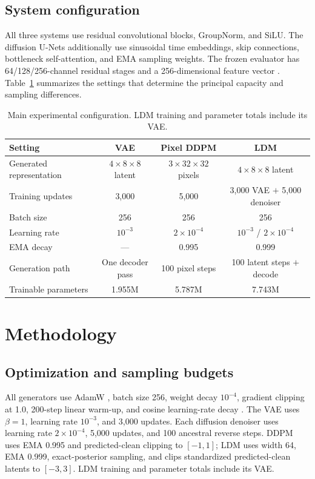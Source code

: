 \documentclass{article}
\begin{document}
\subsection{System configuration}
All three systems use residual convolutional blocks, GroupNorm, and SiLU. The diffusion U-Nets additionally use sinusoidal time embeddings, skip connections, bottleneck self-attention, and EMA sampling weights. The frozen evaluator has 64/128/256-channel residual stages and a 256-dimensional feature vector \citep{he2016resnet}. Table~\ref{tab:configuration} summarizes the settings that determine the principal capacity and sampling differences.

\begin{table}[H]
\caption{Main experimental configuration. LDM training and parameter totals include its VAE.}
\label{tab:configuration}
\centering
\small
\begin{tabular}{lccc}
\toprule
Setting & VAE & Pixel DDPM & LDM \\
\midrule
Generated representation & $4\!\times\!8\!\times\!8$ latent & $3\!\times\!32\!\times\!32$ pixels & $4\!\times\!8\!\times\!8$ latent \\
Training updates & 3,000 & 5,000 & 3,000 VAE $+$ 5,000 denoiser \\
Batch size & 256 & 256 & 256 \\
Learning rate & $10^{-3}$ & $2\!\times\!10^{-4}$ & $10^{-3}$ / $2\!\times\!10^{-4}$ \\
EMA decay & --- & 0.995 & 0.999 \\
Generation path & One decoder pass & 100 pixel steps & 100 latent steps $+$ decode \\
Trainable parameters & 1.955M & 5.787M & 7.743M \\
\bottomrule
\end{tabular}
\end{table}

\section{Methodology}
\subsection{Optimization and sampling budgets}
All generators use AdamW \citep{loshchilov2019adamw}, batch size 256, weight decay $10^{-4}$, gradient clipping at 1.0, 200-step linear warm-up, and cosine learning-rate decay \citep{loshchilov2017sgdr}. The VAE uses $\beta=1$, learning rate $10^{-3}$, and 3,000 updates. Each diffusion denoiser uses learning rate $2\times10^{-4}$, 5,000 updates, and 100 ancestral reverse steps. DDPM uses EMA 0.995 and predicted-clean clipping to $[-1,1]$; LDM uses width 64, EMA 0.999, exact-posterior sampling, and clips standardized predicted-clean latents to $[-3,3]$. LDM training and parameter totals include its VAE.
\end{document}
